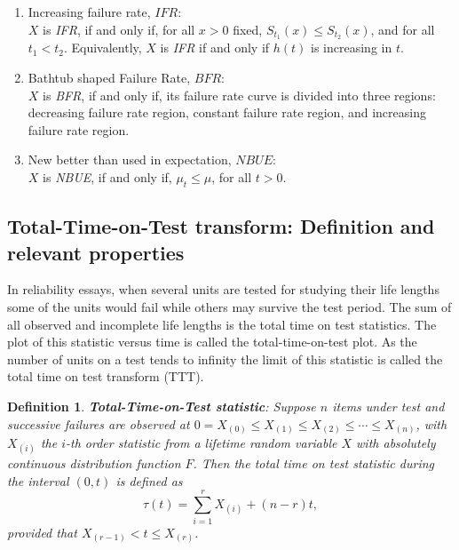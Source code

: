 \documentclass[preprint,12pt]{elsarticle}
\newtheorem{dfn}{{\sc Definition}}[section]
\begin{document}
\begin{enumerate}
\item Increasing failure rate, $IFR$:\\
\noindent $X$ is {\it IFR}, if and only if, for all $x>0 $ fixed, $S_{t_1}(x) \leq S_{t_2}(x)$,  and for all $t_1 < t_2$. Equivalently, $X$ is {\it IFR} if and only if $h(t)$ is increasing  in $t$.

\item Bathtub shaped Failure Rate, $BFR$:\\
\noindent $X$ is  {\it BFR}, if and only if, its  failure rate curve is divided into three regions: decreasing failure rate region, constant failure rate region, and increasing failure rate region.



\item New better than used in expectation, $NBUE$:\\
 \noindent $X$  is {\it NBUE}, if and only if,  $\mu_t \leq  \mu$, for all $t>0$.

\end{enumerate}


\subsection{Total-Time-on-Test transform: Definition and relevant properties} \label{sec:TTT}
In reliability essays, when several units are tested for studying their life lengths some of the units would fail while others may survive the test period. The sum of all observed and incomplete life lengths is the total time on test statistics. The plot of this statistic versus time is called the total-time-on-test plot. As the number of units on a test tends to infinity the limit of this statistic is called the total time on test transform (TTT). 

\begin{dfn} \textbf{Total-Time-on-Test statistic}: \label{ttt.def1}
\noindent Suppose $n$ items under test and successive failures are observed at $0=X_{(0)} \leq X_{(1)} \leq X_{(2)}\leq \cdots \leq X_{(n)}$, with $X_{(i)}$ the $i$-th order statistic from a lifetime random variable $X$ with absolutely continuous distribution function $F$. Then the \textit{total time on test statistic} during the interval $(0,t)$ is defined as 
\[
\tau (t) = \sum_{i=1}^r X_{(i)}+\left(n-r\right)t,
\]
provided that $X_{(r-1)}<t\leq X_{(r)}$.
\end{dfn}

\end{document}
